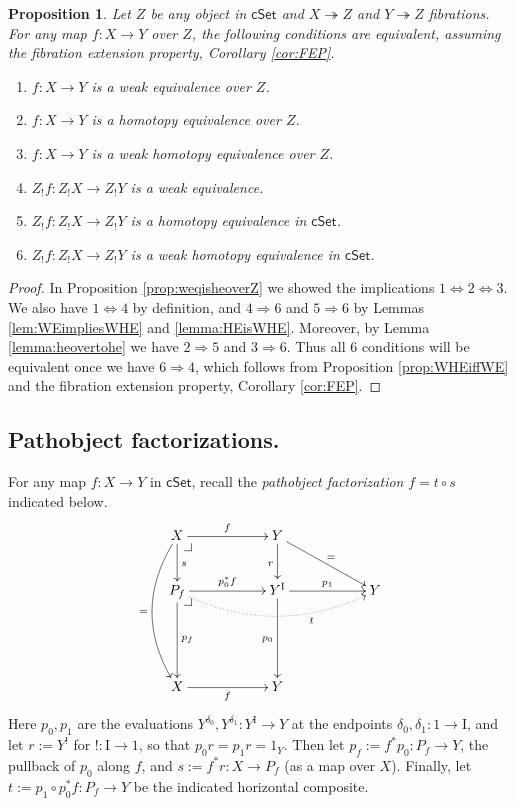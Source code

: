 \documentclass[11pt,reqno]{amsart}
\makeatletter
\newcommand{\cSet}{\ensuremath{\mathsf{cSet}}}
\newcommand{\ra}{\ensuremath{\rightarrow}}
\newcommand{\fib}{\ensuremath{\twoheadrightarrow}}
\renewcommand{\to}{\ensuremath{\rightarrow}}
\newcommand{\I}{\ensuremath{\mathrm{I}}}
\newtheorem{proposition}[theorem]{Proposition}
\theoremstyle{remark}
\theoremstyle{definition}
\newcommand{\pbcorner}[1][dr]{\save*!/#1-1.2pc/#1:(-1,1)@^{|-}\restore}
\makeatother
\begin{document}
\begin{proposition}\label{prop:slicedheweequiv}
Let $Z$ be any object in $\cSet$ and $X \fib Z$ and $Y \fib Z$ fibrations.  For any map $f : X\to Y$ over $Z$,  the following conditions are equivalent, \emph{assuming the fibration extension property, Corollary \ref{cor:FEP}}.
%
\begin{enumerate}
\item $f : X\to Y$  is a weak equivalence over $Z$. 
%
\item $f : X\to Y$   is a  homotopy equivalence over $Z$. 
%
\item $f : X\to Y$   is a weak homotopy equivalence over $Z$. 
%
\item $Z_!f : Z_!X\to Z_!Y$ is a weak equivalence. 
%
\item $Z_!f : Z_!X\to Z_!Y$ is a homotopy equivalence in $\cSet$. 
%
\item $Z_!f : Z_!X\to Z_!Y$ is a weak homotopy equivalence in $\cSet$. 
%
\end{enumerate}
\end{proposition} 

\begin{proof}
In Proposition \ref{prop:weqisheoverZ}  we showed the implications $1\Leftrightarrow 2 \Leftrightarrow 3$.
We also have $1\Leftrightarrow 4$ by definition, and $4\Rightarrow 6$ and $5 \Rightarrow 6$ by Lemmas \ref{lem:WEimpliesWHE} and \ref{lemma:HEisWHE}.  Moreover, by Lemma \ref{lemma:heovertohe} we have $2\Rightarrow 5$ and $3\Rightarrow 6$.  
Thus all 6 conditions will be equivalent once we have $6\Rightarrow 4$, which follows from Proposition \ref{prop:WHEiffWE} and the fibration extension property, Corollary \ref{cor:FEP}. 
\end{proof}


\subsection*{Pathobject factorizations.}

For any map $f :X\ra Y$ in $\cSet$, recall the \emph{pathobject factorization} $f = t\circ s$ indicated below.
\begin{equation}\label{diag:pathspace_factorization}
\xymatrix{
X \ar@/_1.5pc/[ddd]_= \ar[d]^s \ar[rr]^f \pbcorner && Y \ar[d]_r \ar[rrd]^=\\
P_f  \ar[dd]^{p_f} \ar[rr]^{p_0^*f} \ar@{.>}@/_1.5pc/[rrrr]_<<<<<<<<<<<<<<<t \pbcorner && Y^\I \ar[dd]_{p_0} \ar[rr]^-{p_1} && Y \\
\\
X \ar[rr]_f  &&  Y &
}
\end{equation}
Here $p_0, p_1$ are the evaluations $Y^{\delta_{0}}, Y^{\delta_{1}} : Y^\I \to Y$ at the endpoints $\delta_0, \delta_1 : 1\ra\I$, and let $r:= Y^!$ for $! : \I\ra 1$, so that $p_0r = p_1r = 1_Y$.  Then let  $p_f := f^*p_0 : P_f \ra Y$, the pullback of $p_0$ along $f$, and $s:= f^*r : X\ra P_f$ (as a map over $X$).  Finally, let $t:= p_1\circ p_0^*f : P_f \ra Y$ be the indicated horizontal composite. 
\end{document}
